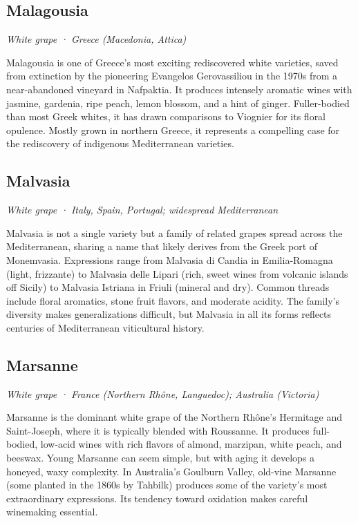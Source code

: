 \subsection*{Malagousia}
\textit{White grape · Greece (Macedonia, Attica)}\par\smallskip

Malagousia is one of Greece’s most exciting rediscovered white varieties, saved from extinction by the pioneering Evangelos Gerovassiliou in the 1970s from a near-abandoned vineyard in Nafpaktia. It produces intensely aromatic wines with jasmine, gardenia, ripe peach, lemon blossom, and a hint of ginger. Fuller-bodied than most Greek whites, it has drawn comparisons to Viognier for its floral opulence. Mostly grown in northern Greece, it represents a compelling case for the rediscovery of indigenous Mediterranean varieties.

\subsection*{Malvasia}
\textit{White grape · Italy, Spain, Portugal; widespread Mediterranean}\par\smallskip

Malvasia is not a single variety but a family of related grapes spread across the Mediterranean, sharing a name that likely derives from the Greek port of Monemvasia. Expressions range from Malvasia di Candia in Emilia-Romagna (light, frizzante) to Malvasia delle Lipari (rich, sweet wines from volcanic islands off Sicily) to Malvasia Istriana in Friuli (mineral and dry). Common threads include floral aromatics, stone fruit flavors, and moderate acidity. The family’s diversity makes generalizations difficult, but Malvasia in all its forms reflects centuries of Mediterranean viticultural history.

\subsection*{Marsanne}
\textit{White grape · France (Northern Rhône, Languedoc); Australia (Victoria)}\par\smallskip

Marsanne is the dominant white grape of the Northern Rhône’s Hermitage and Saint-Joseph, where it is typically blended with Roussanne. It produces full-bodied, low-acid wines with rich flavors of almond, marzipan, white peach, and beeswax. Young Marsanne can seem simple, but with aging it develops a honeyed, waxy complexity. In Australia’s Goulburn Valley, old-vine Marsanne (some planted in the 1860s by Tahbilk) produces some of the variety’s most extraordinary expressions. Its tendency toward oxidation makes careful winemaking essential.

